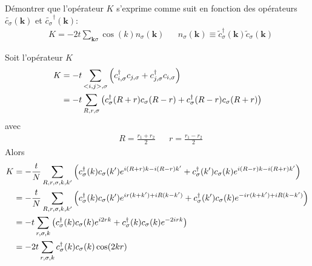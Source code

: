 \documentclass{subfiles}[../main.tex]
\begin{document}
            \begin{problem}
                Démontrer que l'opérateur $K$ s'exprime
                comme suit en fonction des opérateurs
                $\widetilde{c_\sigma}(\bm{k})$ et
                $\widetilde{c_\sigma}^\dagger(\bm{k})$:
                \begin{align}
                    &K=-2t\sum_{\bm{k}\sigma}
                    \cos(k)n_\sigma(\bm{k})
                    &&n_\sigma(\bm{k})\equiv
                    \widetilde{c}_\sigma^\dagger(\bm{k})
                    \widetilde{c}_\sigma(\bm{k})
                \end{align}
            \end{problem}
            Soit l'opérateur $K$
            \begin{align}
                K&=-t\sum_{<i,j>,\sigma}\qty(c^\dagger_{i,\sigma}c_{j,\sigma}
                +c^\dagger_{j,\sigma}c_{i,\sigma})\\
                &=-t\sum_{R,r,\sigma}\qty(c^\dagger_{\sigma}(R+r)c_{\sigma}(R-r)
                +c^\dagger_{\sigma}(R-r)c_{\sigma}(R+r))
            \end{align}
            avec
            \begin{align}
                &R=\frac{r_1+r_2}{2}
                &&r=\frac{r_1-r_2}{2}
            \end{align}
            Alors
            \begin{align}
                K&=-\frac{t}{N}\sum_{R,r,\sigma,k,k'}\qty(
                    c^\dagger_{\sigma}(k)c_\sigma(k')e^{i(R+r)k-i(R-r)k'}+
                    c^\dagger_{\sigma}(k')c_\sigma(k)e^{i(R-r)k-i(R+r)k'}
                )\\
                &=-\frac{t}{N}\sum_{R,r,\sigma,k,k'}\qty(
                    c^\dagger_{\sigma}(k)c_\sigma(k')e^{ir(k+k')+iR(k-k')}+
                    c^\dagger_{\sigma}(k')c_\sigma(k)e^{-ir(k+k')+iR(k-k')}
                )\\
                &=-t\sum_{r,\sigma,k}\qty(
                    c^\dagger_{\sigma}(k)c_\sigma(k)e^{i2rk}+
                    c^\dagger_{\sigma}(k)c_\sigma(k)e^{-2irk}
                )\\
                &=-2t\sum_{r,\sigma,k}
                    c^\dagger_{\sigma}(k)c_\sigma(k)\cos(2kr)
            \end{align}
\end{document}
